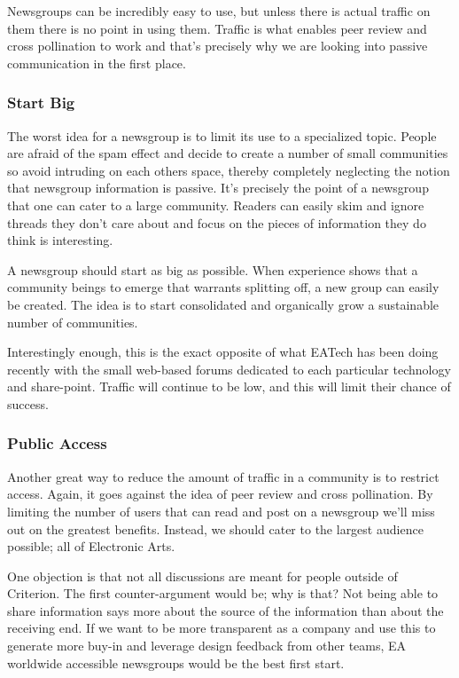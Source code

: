 \documentclass[twocolumn]{paper}
\begin{document}
Newsgroups can be incredibly easy to use, but unless there is actual
traffic on them there is no point in using them. Traffic is what
enables peer review and cross pollination to work and that's
precisely why we are looking into passive communication in the first
place.

\subsubsection{Start Big}

The worst idea for a newsgroup is to limit its use to a specialized
topic. People are afraid of the spam effect and decide to create a
number of small communities so avoid intruding on each others space,
thereby completely neglecting the notion that newsgroup information
is passive. It's precisely the point of a newsgroup that one can
cater to a large community. Readers can easily skim and ignore
threads they don't care about and focus on the pieces of information
they do think is interesting.

A newsgroup should start as big as possible. When experience shows
that a community beings to emerge that warrants splitting off, a new
group can easily be created. The idea is to start consolidated and
organically grow a sustainable number of communities.

Interestingly enough, this is the exact opposite of what EATech has
been doing recently with the small web-based forums dedicated to
each particular technology and share-point. Traffic will continue to
be low, and this will limit their chance of success.

\subsubsection{Public Access}

Another great way to reduce the amount of traffic in a community is
to restrict access. Again, it goes against the idea of peer review
and cross pollination. By limiting the number of users that can read
and post on a newsgroup we'll miss out on the greatest benefits.
Instead, we should cater to the largest audience possible; all of
Electronic Arts.

One objection is that not all discussions are meant for people
outside of Criterion. The first counter-argument would be; why is
that? Not being able to share information says more about the source
of the information than about the receiving end. If we want to be
more transparent as a company and use this to generate more buy-in
and leverage design feedback from other teams, EA worldwide
accessible newsgroups would be the best first start.
\end{document}
